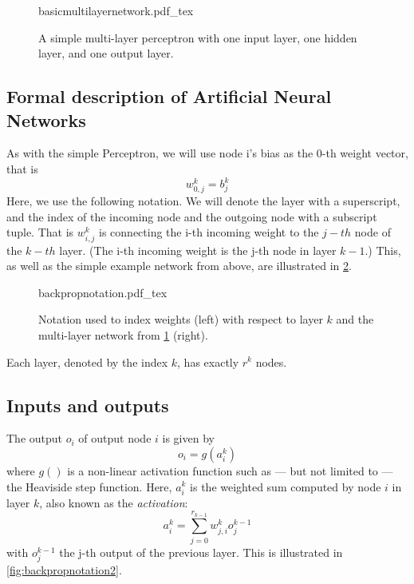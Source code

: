 \begin{figure}
    \centering
    \def\svgwidth{0.8\textwidth}
    {basicmultilayernetwork.pdf_tex}
    \caption{A simple multi-layer perceptron with one input layer, one hidden layer, and one output layer. \label{fig:basicmultilayer}}
\end{figure}

\subsection{Formal description of Artificial Neural Networks}
As with the simple Perceptron, we will use node i's bias as the 0-th weight vector, that is
\begin{equation}
w^k_{0,j}=b^k_j
\end{equation}
Here, we use the following notation. We will denote the layer with a superscript, and the index of the incoming node and the outgoing node with a subscript tuple. That is $w^k_{i,j}$ is connecting the i-th incoming weight to the $j-th$ node of the $k-th$ layer. (The i-th incoming weight is the j-th node in layer $k-1$.) This, as well as the simple example network from above, are illustrated in \cref{fig:backpropnotation}.

\begin{figure}[htb]
    \centering
    \def\svgwidth{0.7\textwidth}
    {backpropnotation.pdf_tex}
    \caption{Notation used to index weights (left) with respect to layer $k$ and the multi-layer network from \cref{fig:basicmultilayer} (right).\label{fig:backpropnotation}}
\end{figure}

Each layer, denoted by the index $k$, has exactly $r^k$ nodes.

\subsection{Inputs and outputs}

The output $o_i$ of output node $i$ is given by
\begin{equation}
o_i=g(a_i^k)
\end{equation}
where $g()$ is a non-linear activation function such as --- but not limited to --- the Heaviside step function. Here, $a_i^k$ is the weighted sum computed by node $i$ in layer $k$, also known as the \textsl{activation}:
\begin{equation}
a_i^k=\sum_{j=0}^{r_{k-1}}w_{j,i}^ko_j^{k-1}
\end{equation}
with $o_j^{k-1}$ the j-th output of the previous layer. This is illustrated in \cref{fig:backpropnotation2}.


